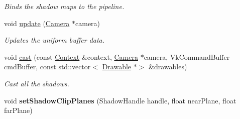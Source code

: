 \begin{DoxyCompactItemize}
\begin{DoxyCompactList}\small\item\em Binds the shadow maps to the pipeline. \end{DoxyCompactList}\item 
\mbox{\label{classblaze_1_1ShadowCaster_ab61005d44225af6bffe288bf81a2f4a3}} 
void \hyperlink{classblaze_1_1ShadowCaster_ab61005d44225af6bffe288bf81a2f4a3}{update} (\hyperlink{classblaze_1_1Camera}{Camera} $\ast$camera)
\begin{DoxyCompactList}\small\item\em Updates the uniform buffer data. \end{DoxyCompactList}\item 
void \hyperlink{classblaze_1_1ShadowCaster_a9867873f884b38c5da795e798f07943a}{cast} (const \hyperlink{classblaze_1_1Context}{Context} \&context, \hyperlink{classblaze_1_1Camera}{Camera} $\ast$camera, Vk\+Command\+Buffer cmd\+Buffer, const std\+::vector$<$ \hyperlink{classblaze_1_1Drawable}{Drawable} $\ast$$>$ \&drawables)
\begin{DoxyCompactList}\small\item\em Cast all the shadows. \end{DoxyCompactList}\item 
\mbox{\label{classblaze_1_1ShadowCaster_a6217a8cab1973ef9f7ab72f61fd10921}} 
void {\bfseries set\+Shadow\+Clip\+Planes} (Shadow\+Handle handle, float near\+Plane, float far\+Plane)
\end{DoxyCompactItemize}
